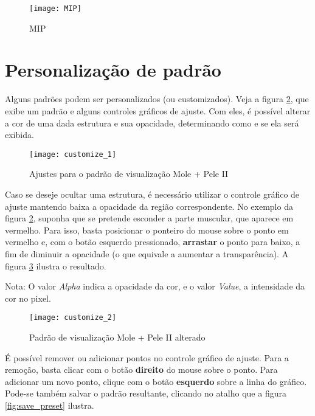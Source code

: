 \begin{figure}[!htb]
\centering
\texttt{[image: MIP]}
\caption{MIP}
\label{fig:MIP}
\end{figure}


\newpage


\section{Personalização de padrão}

Alguns padrões podem ser personalizados (ou customizados). Veja a figura
\ref{fig:customize_1}, que exibe um padrão e alguns controles gráficos de ajuste.
Com eles, é possível alterar a cor de uma dada estrutura e sua opacidade, determinando
como e se ela será exibida.

\begin{figure}[!htb]
\centering
\texttt{[image: customize\_1]}
\caption{Ajustes para o padrão de visualização Mole + Pele II}
\label{fig:customize_1}
\end{figure}


\newpage


Caso se deseje ocultar uma estrutura, é necessário utilizar o controle gráfico de ajuste mantendo
baixa a opacidade da região correspondente. No exemplo da figura \ref{fig:customize_1},
suponha que se pretende esconder a parte muscular, que aparece em vermelho. Para isso, basta
posicionar o ponteiro do mouse sobre o ponto em vermelho e, com o botão esquerdo pressionado,
\textbf{arrastar} o ponto para baixo, a fim de diminuir a opacidade (o que equivale a aumentar
a transparência). A figura \ref{fig:customize_2} ilustra o resultado.

Nota: O valor \textit{Alpha} indica a opacidade da cor, e o valor \textit{Value}, a
intensidade da cor no pixel.

\begin{figure}[!htb]
\centering
\texttt{[image: customize\_2]}
\caption{Padrão de visualização Mole + Pele II alterado}
\label{fig:customize_2}
\end{figure}


\newpage


É possível remover ou adicionar pontos no controle gráfico de ajuste. Para a remoção, basta clicar
com o botão \textbf{direito} do mouse sobre o ponto. Para adicionar um novo ponto, clique com
o botão \textbf{esquerdo} sobre a linha do gráfico. Pode-se também salvar o padrão resultante,
clicando no atalho que a figura \ref{fig:save_preset} ilustra.

